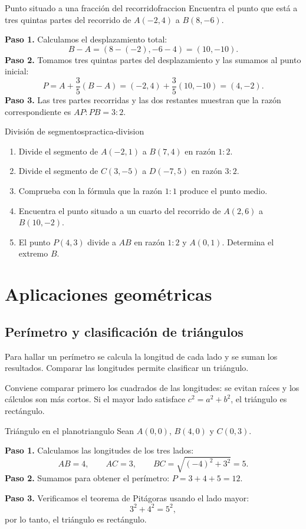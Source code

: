 \begin{example}{Punto situado a una fracción del recorrido}{fraccion}
Encuentra el punto que está a tres quintas partes del recorrido de
$A(-2,4)$ a $B(8,-6)$.
\begin{solution}
\textbf{Paso 1.} Calculamos el desplazamiento total:
\[
B-A=(8-(-2),-6-4)=(10,-10).
\]
\textbf{Paso 2.} Tomamos tres quintas partes del desplazamiento y las sumamos
al punto inicial:
\[
P=A+\frac35(B-A)=(-2,4)+\frac35(10,-10)=(4,-2).
\]
\textbf{Paso 3.} Las tres partes recorridas y las dos restantes muestran que
la razón correspondiente es $AP:PB=3:2$.
\end{solution}
\end{example}

\begin{exercise}{División de segmentos}{practica-division}
\begin{enumerate}[label=\alph*)]
  \item Divide el segmento de $A(-2,1)$ a $B(7,4)$ en razón $1:2$.
  \item Divide el segmento de $C(3,-5)$ a $D(-7,5)$ en razón $3:2$.
  \item Comprueba con la fórmula que la razón $1:1$ produce el punto medio.
  \item Encuentra el punto situado a un cuarto del recorrido de $A(2,6)$ a
  $B(10,-2)$.
  \item El punto $P(4,3)$ divide a $AB$ en razón $1:2$ y $A(0,1)$. Determina
  el extremo $B$.
\end{enumerate}
\end{exercise}

\section{Aplicaciones geométricas}

\subsection{Perímetro y clasificación de triángulos}

Para hallar un perímetro se calcula la longitud de cada lado y se suman los
resultados. Comparar las longitudes permite clasificar un triángulo.

Conviene comparar primero los cuadrados de las longitudes: se evitan raíces y
los cálculos son más cortos. Si el mayor lado satisface $c^2=a^2+b^2$, el
triángulo es rectángulo.

\begin{example}{Triángulo en el plano}{triangulo}
Sean $A(0,0)$, $B(4,0)$ y $C(0,3)$.
\begin{solution}
\textbf{Paso 1.} Calculamos las longitudes de los tres lados:
\[
AB=4,\qquad AC=3,\qquad BC=\sqrt{(-4)^2+3^2}=5.
\]
\textbf{Paso 2.} Sumamos para obtener el perímetro:
$P=3+4+5=12$.

\textbf{Paso 3.} Verificamos el teorema de Pitágoras usando el lado mayor:
\[
3^2+4^2=5^2,
\]
por lo tanto, el triángulo es rectángulo.
\end{solution}
\end{example}

